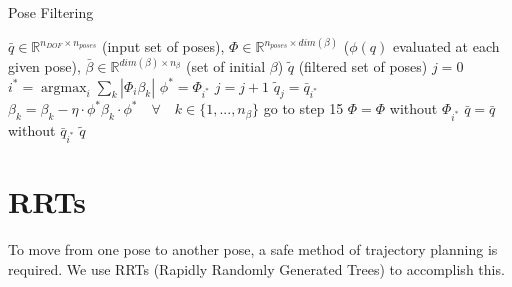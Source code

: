 \documentclass[letterpaper, 10pt, conference]{ieeeconf}
\DeclareMathOperator*{\argmax}{argmax}
\begin{document}
\begin{algorithm}
    \caption{Pose Filtering}
    \begin{algorithmic}[1]
        \renewcommand{\algorithmicrequire}{\textbf{Input:}}
        \renewcommand{\algorithmicensure}{\textbf{Output:}}
        \REQUIRE $\bar{q} \in \mathbb{R}^{n_{DOF} \times n_{poses}}$ (input set
        of poses),
        \newline $\Phi \in \mathbb{R}^{n_{poses} \times dim(\beta)}$ ($\phi(q)$ evaluated at each given pose),
        \newline $\bar{\beta} \in \mathbb{R}^{dim(\beta) \times n_{\beta}}$ (set of initial $\beta$)
        \ENSURE  $\widetilde{q}$ (filtered set of poses)
        \STATE $ j = 0 $
        \STATE $i^* = \argmax_i \sum_k | \Phi_i \beta_k |$
        \STATE $\phi^* = \Phi_{i^{*}}$
        \STATE $j = j + 1$
        \STATE $\widetilde{q}_j = \bar{q}_{i^*} $
        \STATE $\beta_k = \beta_k - \eta \cdot \phi^* \beta_k \cdot \phi^* \quad \forall \quad k \in \{1, ..., n_\beta \}$
        \STATE go to step 15
        \ELSE
        \STATE $\Phi = \Phi $ without $ \Phi_{i^*} $
        \STATE $\bar{q} = \bar{q} $ without $ \bar{q}_{i^*} $
        \ENDIF
        \ENDWHILE
        \RETURN $\widetilde{q}$
    \end{algorithmic}
\end{algorithm}

\section{RRTs}

To move from one pose to another pose, a safe method of trajectory planning is
required. We use RRTs (Rapidly Randomly Generated Trees) to accomplish this.
\end{document}
